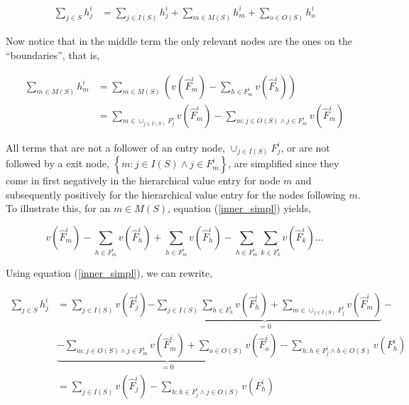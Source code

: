 \documentclass[american]{scrartcl}
\newcommand{\set}[1]{\left\{#1\right\}}
\begin{document}
\begin{equation}
    \begin{split}
        \sum_{j \in S} h_j^i &= \sum_{j \in I(S)} h_j^i + \sum_{m \in M(S)} h_m^i + \sum_{o \in O(S)} h_o^i
    \end{split}
\end{equation}

Now notice that in the middle term the only relevant nodes are the ones on the ``boundaries'', that is,

\begin{equation} \label{inner_simpl}
    \begin{split}
        \sum_{m \in M(S)} h_m^i &= \sum_{m \in M(S)} \left( v(\hat{F}^i_m) - \sum_{h \in F^i_m}  v(\hat{F}^i_h) \right) \\
        &= \sum_{m \in \cup_{j \in I(S)} F^i_j} v(\hat{F}^i_m) - \sum_{m: j \in O(S) \land j \in F^i_m} v(\hat{F}^i_m)
    \end{split}
\end{equation}

All terms that are not a follower of an entry node, $\cup_{j \in I(S)} F_j^i$, or are not followed by a exit node, $\set{m: j \in I(S) \land j \in F^i_m}$, are simplified since they come in first negatively in the hierarchical value entry for node $m$ and subsequently positively for the hierarchical value entry for the nodes following $m$. To illustrate this, for an $m \in M(S)$, equation (\ref{inner_simpl}) yields,

\begin{equation}
    v(\hat{F}_m^i) - \sum_{h \in F^i_m} v(\hat{F}_h^i) + \sum_{h \in F^i_m} v(\hat{F}_h^i) - \sum_{h \in F^i_m} \sum_{k \in F^i_k} v(\hat{F}_k^i) \ldots
\end{equation}

Using equation (\ref{inner_simpl}), we can rewrite,

\begin{equation} \label{component_breakup}
    \begin{split}
        \sum_{j \in S} h_j^i &= \sum_{j \in I(S)} v(\hat{F}_j^i) \underbrace{- \sum_{j \in I(S)} \sum_{h \in F_h^i}  v(\hat{F}_h^i)+
            \sum_{m \in \cup_{j \in I(S)} F^i_j} v(\hat{F}^i_m)}_{= 0} - \\ & \underbrace{- \sum_{m: j \in O(S) \land j \in F^i_m} v(\hat{F}^i_m)
            + \sum_{o \in O(S)} v(\hat{F}^i_o)}_{=0} - \sum_{h: h \in F_j^i \land h \in O(S)} v(F^i_h) \\
        &= \sum_{j \in I(S)} v(\hat{F}_j^i) - \sum_{h: h \in F_j^i \land j \in O(S)} v(F^i_h)
    \end{split}
\end{equation}
\end{document}
